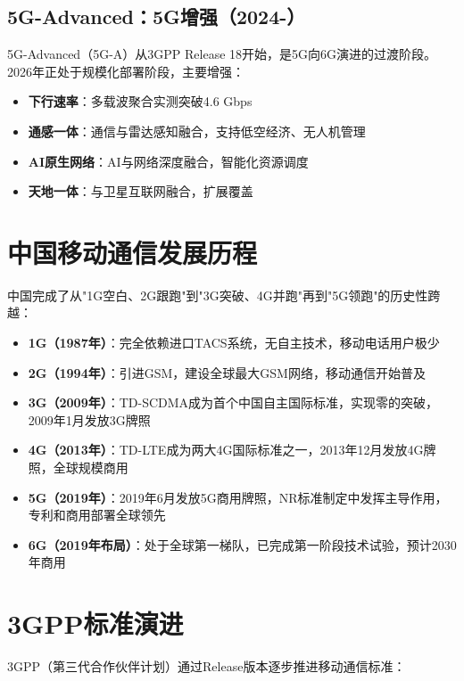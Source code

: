 \documentclass[12pt,UTF8]{ctexbook}
\begin{document}
\subsection{5G-Advanced：5G增强（2024-）}
5G-Advanced（5G-A）从3GPP Release 18开始，是5G向6G演进的过渡阶段。2026年正处于规模化部署阶段，主要增强：
\begin{itemize}[leftmargin=2cm]
    \item \textbf{下行速率}：多载波聚合实测突破4.6 Gbps
    \item \textbf{通感一体}：通信与雷达感知融合，支持低空经济、无人机管理
    \item \textbf{AI原生网络}：AI与网络深度融合，智能化资源调度
    \item \textbf{天地一体}：与卫星互联网融合，扩展覆盖
\end{itemize}

\section{中国移动通信发展历程}
\label{sec:china_mobile}

中国完成了从"1G空白、2G跟跑"到"3G突破、4G并跑"再到"5G领跑"的历史性跨越：

\begin{itemize}[leftmargin=2cm]
    \item \textbf{1G（1987年）}：完全依赖进口TACS系统，无自主技术，移动电话用户极少
    \item \textbf{2G（1994年）}：引进GSM，建设全球最大GSM网络，移动通信开始普及
    \item \textbf{3G（2009年）}：TD-SCDMA成为首个中国自主国际标准，实现零的突破，2009年1月发放3G牌照
    \item \textbf{4G（2013年）}：TD-LTE成为两大4G国际标准之一，2013年12月发放4G牌照，全球规模商用
    \item \textbf{5G（2019年）}：2019年6月发放5G商用牌照，NR标准制定中发挥主导作用，专利和商用部署全球领先
    \item \textbf{6G（2019年布局）}：处于全球第一梯队，已完成第一阶段技术试验，预计2030年商用
\end{itemize}

\section{3GPP标准演进}
\label{sec:3gpp_releases}

3GPP（第三代合作伙伴计划）通过Release版本逐步推进移动通信标准：
\end{document}
